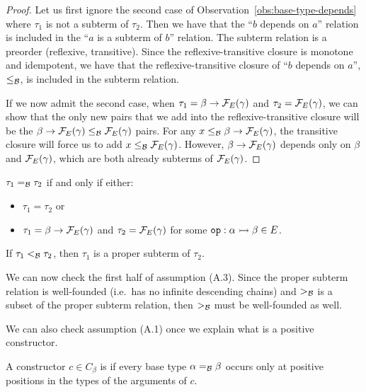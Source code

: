 \begin{proof}
  Let us first ignore the second case of
  Observation~\ref{obs:base-type-depends} where $\tau_1$ is not a subterm
  of $\tau_2$. Then we have that the ``$b$ depends on $a$'' relation is
  included in the ``$a$ is a subterm of $b$'' relation. The subterm
  relation is a preorder (reflexive, transitive). Since the
  reflexive-transitive closure is monotone and idempotent, we have that the
  reflexive-transitive closure of ``$b$ depends on $a$'', $\le_{\mathcal{B}}$, is
  included in the subterm relation.

  If we now admit the second case, when $\tau_1 = \beta \to \mathcal{F}_E(\gamma)$
  and $\tau_2 = \mathcal{F}_E(\gamma)$, we can show that the only new pairs that we
  add into the reflexive-transitive closure will be the
  $\beta \to \mathcal{F}_E(\gamma) \le_{\mathcal{B}} \mathcal{F}_E(\gamma)$ pairs. For any
  $x \le_{\mathcal{B}} \beta \to \mathcal{F}_E(\gamma)$, the transitive closure will force us
  to add $x \le_{\mathcal{B}} \mathcal{F}_E(\gamma)$. However, $\beta \to \mathcal{F}_E(\gamma)$
  depends only on $\beta$ and $\mathcal{F}_E(\gamma)$, which are both already
  subterms of $\mathcal{F}_E(\gamma)$.
\end{proof}

\begin{corollary}\label{cor:base-type-eq}
  $\tau_1 =_{\mathcal{B}} \tau_2$ if and only if either:

  \begin{itemize}
  \item $\tau_1 = \tau_2$ or
  \item $\tau_1 = \beta \to \mathcal{F}_E(\gamma)$ and $\tau_2 = \mathcal{F}_E(\gamma)$ for
    some $\mathtt{op} : \alpha \rightarrowtail \beta \in E$.
  \end{itemize}
\end{corollary}

\begin{corollary}\label{cor:base-type-lt}
  If $\tau_1 <_{\mathcal{B}} \tau_2$, then $\tau_1$ is a proper subterm of $\tau_2$.
\end{corollary}

We can now check the first half of assumption (A.3). Since the proper
subterm relation is well-founded (i.e.\ has no infinite descending chains)
and $>_{\mathcal{B}}$ is a subset of the proper subterm relation, then $>_{\mathcal{B}}$ must
be well-founded as well.

We can also check assumption (A.1) once we explain what is a positive
constructor.

\begin{definition}\label{def:positive-constructor}
  A constructor $c \in C_\beta$ is  if every base type
  $\alpha =_{\mathcal{B}} \beta$ occurs only at positive positions in the types of
  the arguments of $c$.
\end{definition}

